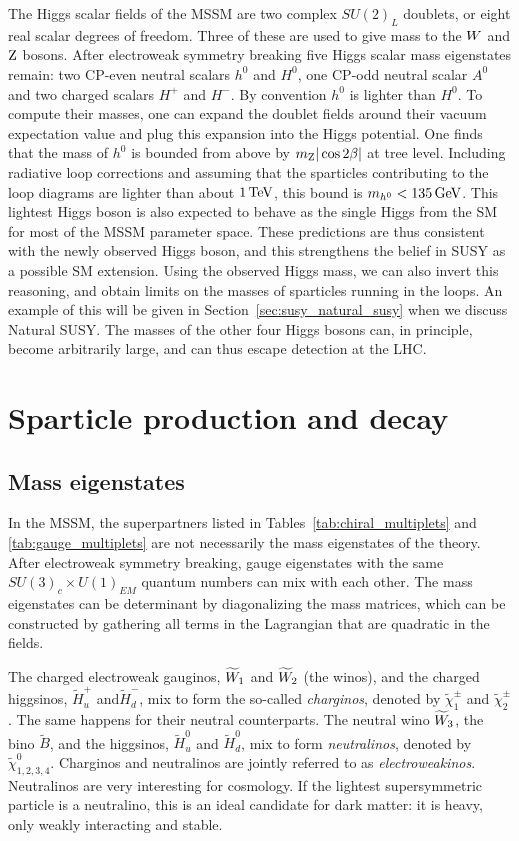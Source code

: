 The Higgs scalar fields of the MSSM are two complex $SU(2)_L$ doublets, or eight real scalar degrees
of freedom. 
Three of these are used to give mass to the $W$ and $\mathrm{Z}$ bosons. 
After electroweak symmetry breaking five Higgs scalar mass eigenstates remain: two CP-even neutral
scalars $h^0$ and $H^0$, one CP-odd neutral scalar $A^0$ and two charged scalars $H^+$ and $H^-$. By
convention $h^0$ is lighter than $H^0$. 
To compute their masses, one can expand the doublet fields around their vacuum expectation value and
plug this expansion into the Higgs potential. One finds that the mass of $h^0$ is bounded from
above by $m_{\mathrm{Z}} |\cos 2\beta|$ at tree level. Including radiative loop corrections and assuming
that the sparticles contributing to the loop diagrams are lighter than about $1\,\text{Te\hspace{-.08em}V}$, this bound is
$m_{h^0} < 135\,\text{Ge\hspace{-.08em}V}$. 
This lightest Higgs boson is also expected to behave as the single Higgs from the SM for most of
the MSSM parameter space. 
These predictions are thus consistent with the newly observed Higgs boson, and this strengthens the
belief in SUSY as a possible SM extension. Using the observed Higgs mass,
we can also invert this reasoning, and obtain limits on the masses of sparticles running in the
loops. An example of this will be given in Section~\ref{sec:susy_natural_susy} when we discuss
Natural SUSY. 
The masses of the other four Higgs bosons can, in principle, become arbitrarily large, and can
thus escape detection at the LHC. 


\section{Sparticle production and decay \label{sec:susy_sparticles}}

\subsection{Mass eigenstates}

In the MSSM, the superpartners listed in Tables~\ref{tab:chiral_multiplets} and
\ref{tab:gauge_multiplets} are not necessarily the mass eigenstates of the theory. After
electroweak symmetry breaking, gauge eigenstates with the same $SU(3)_c \times U(1)_{EM}$ quantum
numbers can mix with each other. 
The mass eigenstates can be determinant by diagonalizing the mass matrices, which can be
constructed by gathering all terms in the Lagrangian that are quadratic in the fields. 

The charged electroweak gauginos, $\widetilde{W}_1$ and $\widetilde{W}_2$ (the winos), and the
charged higgsinos, $\widetilde{H}_u^+$ and$\widetilde{H}_d^-$, mix to form the so-called
\textit{charginos}, denoted by $\widetilde{\chi}_1^\pm$ and $\widetilde{\chi}_2^\pm$. 
The same happens for their neutral counterparts. The neutral wino $\widetilde{W}_3$, the bino
$\widetilde{B}$, and the higgsinos, $\widetilde{H}_u^0$ and $\widetilde{H}_d^0$,  mix to form
\textit{neutralinos}, denoted by $\widetilde{\chi}_{1,2,3,4}^0$. 
Charginos and neutralinos are jointly referred to as \textit{electroweakinos}.
Neutralinos are very interesting for cosmology. If the lightest supersymmetric particle is a
neutralino, this is an ideal candidate for dark matter: it is heavy, only weakly interacting and
stable. 

